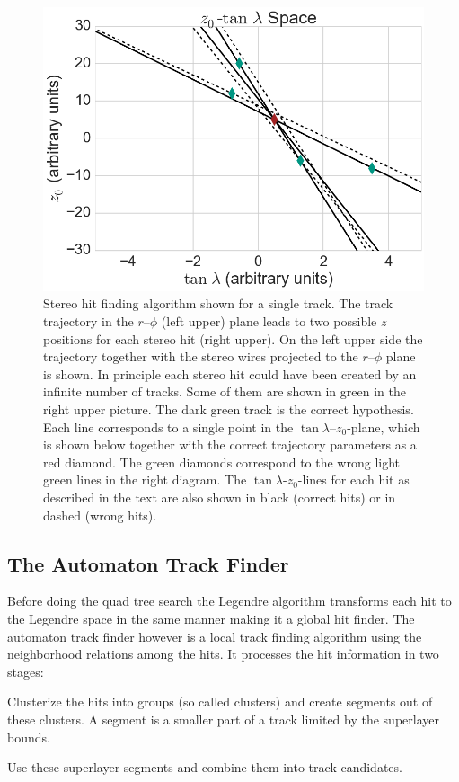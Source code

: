 \begin{figure}
 \vspace*{1cm}
 \includegraphics[scale=0.3]{figures/theory/stereo_3.png}
 \caption[Stereo Legendre algorithm.]{Stereo hit finding algorithm shown for a single track. The track trajectory in the $r$--$\phi$ (left upper) plane leads to two possible $z$ positions for each stereo hit (right upper). On the left upper side the trajectory together with the stereo wires projected to the $r$--$\phi$ plane is shown. In principle each stereo hit could have been created by an infinite number of tracks. Some of them are shown in green in the right upper picture. The dark green track is the correct hypothesis. Each line corresponds to a single point in the $\tan \lambda$--$z_0$-plane, which is shown below together with the correct trajectory parameters as a red diamond. The green diamonds correspond to the wrong light green lines in the right diagram. The $\tan \lambda$-$z_0$-lines for each hit as described in the text are also shown in black (correct hits) or in dashed (wrong hits).}
 \label{fig-stereo-explained}
\end{figure}


\subsection{The Automaton Track Finder}
Before doing the quad tree search the Legendre algorithm transforms each hit to the Legendre space in the same manner making it a global hit finder. The automaton track finder however is a local track finding algorithm using the neighborhood relations among the hits. It processes the hit information in two stages:
\begin{zlist}
  \item Clusterize the hits into groups (so called clusters) and create segments out of these clusters. A segment is a smaller part of a track limited by the superlayer bounds. 
  \item Use these superlayer segments and combine them into track candidates.
\end{zlist}

